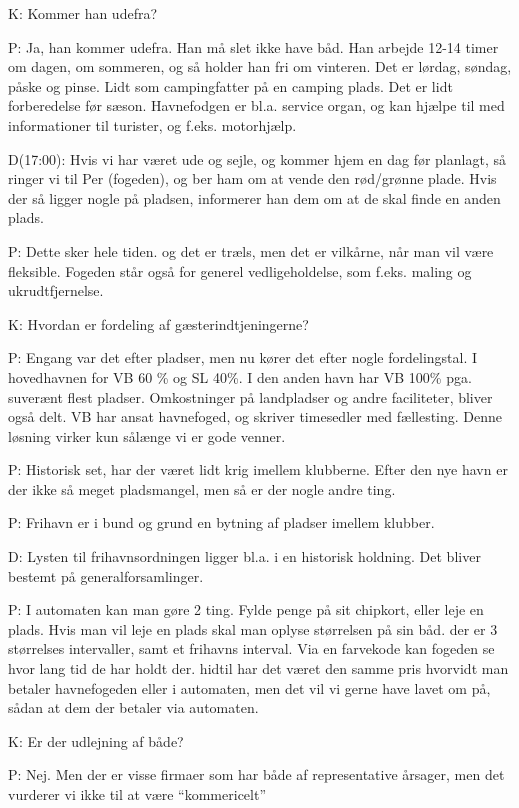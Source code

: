\documentclass{article}
\begin{document}
K: Kommer han udefra?

P: Ja, han kommer udefra. Han må slet ikke have båd. Han arbejde 12-14 timer om dagen, om sommeren, og så holder han fri om vinteren. Det er lørdag, søndag, påske og pinse. Lidt som campingfatter på en camping plads. Det er lidt forberedelse før sæson. Havnefodgen er bl.a. service organ, og kan hjælpe til med informationer til turister, og f.eks. motorhjælp.

D(17:00): Hvis vi har været ude og sejle, og kommer hjem en dag før planlagt, så ringer vi til Per (fogeden), og ber ham om at vende den rød/grønne plade. Hvis der så ligger nogle på pladsen, informerer han dem om at de skal finde en anden plads.

P: Dette sker hele tiden. og det er træls, men det er vilkårne, når man vil være fleksible. Fogeden står også for generel vedligeholdelse, som f.eks. maling og ukrudtfjernelse.


K: Hvordan er fordeling af gæsterindtjeningerne?

P: Engang var det efter pladser, men nu kører det efter nogle fordelingstal. I hovedhavnen for VB 60 \% og SL 40\%. I den anden havn har VB 100\% pga. suverænt flest pladser. Omkostninger på landpladser og andre faciliteter, bliver også delt. VB har ansat havnefoged, og skriver timesedler med fællesting. Denne løsning virker kun sålænge vi er gode venner.


P: Historisk set, har der været lidt krig imellem klubberne. Efter den nye havn er der ikke så meget pladsmangel, men så er der nogle andre ting.


P: Frihavn er i bund og grund en bytning af pladser imellem klubber.


D: Lysten til frihavnsordningen ligger bl.a. i en historisk holdning. Det bliver bestemt på generalforsamlinger.


P: I automaten kan man gøre 2 ting. Fylde penge på sit chipkort, eller leje en plads. Hvis man vil leje en plads skal man oplyse størrelsen på sin båd. der er 3 størrelses intervaller, samt et frihavns interval. Via en farvekode kan fogeden se hvor lang tid de har holdt der. hidtil har det været den samme pris hvorvidt man betaler havnefogeden eller i automaten, men det vil vi gerne have lavet om på, sådan at dem der betaler via automaten.


K: Er der udlejning af både?

P: Nej. Men der er visse firmaer som har både af representative årsager, men det vurderer vi ikke til at være “kommericelt”
\end{document}
